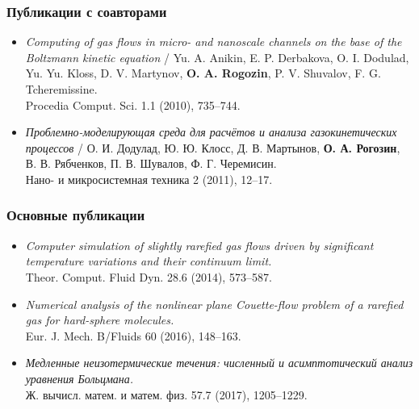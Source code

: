 \documentclass[mathserif]{beamer} %
\begin{document}
\begin{frame}
    \frametitle{Публикации с соавторами}
    \begin{itemize}
        \item \textit{Computing of gas flows in micro- and nanoscale channels on the base of the Boltzmann kinetic equation}
        / Yu. A. Anikin, E. P. Derbakova, O. I. Dodulad, Yu. Yu. Kloss, D. V. Martynov,
            \textbf{O. A. Rogozin}, P. V. Shuvalov, F. G. Tcheremissine. \\
        \alert{Procedia Comput. Sci.} 1.1 (2010), 735--744.
        \item \textit{Проблемно-моделирующая среда для расчётов и анализа газокинетических процессов}
        / О. И. Додулад, Ю. Ю. Клосс, Д. В. Мартынов,
            \textbf{О. А. Рогозин}, В. В. Рябченков, П. В. Шувалов, Ф. Г. Черемисин. \\
        \alert{Нано- и микросистемная техника} 2 (2011), 12--17.
    \end{itemize}
\end{frame}

\begin{frame}
    \frametitle{Основные публикации}
    \begin{itemize}
        \item \textit{Computer simulation of slightly rarefied gas flows driven
            by significant temperature variations and their continuum limit.} \\
        \alert{Theor. Comput. Fluid Dyn.} 28.6 (2014), 573--587.
        \item \textit{Numerical analysis of the nonlinear plane Couette-flow problem of a rarefied gas for hard-sphere molecules.} \\
        \alert{Eur. J. Mech. B/Fluids} 60 (2016), 148--163.
        \item \textit{Медленные неизотермические течения: численный и асимптотический анализ уравнения Больцмана.} \\
        \alert{Ж. вычисл. матем. и матем. физ.} 57.7 (2017), 1205--1229.
    \end{itemize}
\end{frame}
\end{document}
